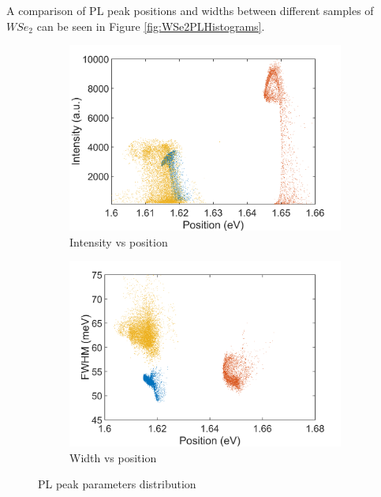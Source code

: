 A comparison of PL peak positions and widths between different samples of $WSe_2$ can be seen in Figure \ref{fig:WSe2PLHistograms}.

\begin{figure}[!h]
	\begin{center}
		\begin{subfigure}[b]{0.45\textwidth}
			\includegraphics[width=\textwidth]{WSe2/WSe2PositionIntensityScatterComparison.png}
			\caption{Intensity vs position}
			\label{fig:WSe2PositionIntensityScatterComparison}
		\end{subfigure}
		\qquad
		\begin{subfigure}[b]{0.45\textwidth}
			\includegraphics[width=\textwidth]{WSe2/Wse2PositionWidthScatterComparison.png}
			\caption{Width vs position}
			\label{fig:WSe2PositionWidthScatterComparison}
		\end{subfigure}
		\caption{PL peak parameters distribution}
		\label{fig:WSe2ScatterComparison}
	\end{center}
\end{figure}

